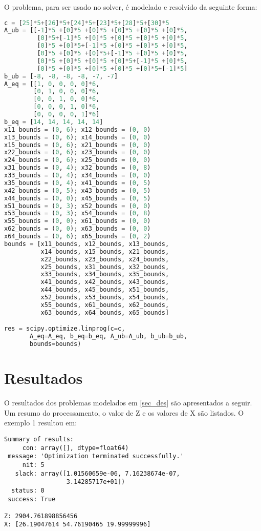 \documentclass[conference,compsoc]{IEEEtran}
\begin{document}
O problema, para ser usado no solver, é modelado e resolvido da seguinte forma:

\begin{lstlisting}[language=Python]
c = [25]*5+[26]*5+[24]*5+[23]*5+[28]*5+[30]*5
A_ub = [[-1]*5 +[0]*5 +[0]*5 +[0]*5 +[0]*5 +[0]*5,
         [0]*5+[-1]*5 +[0]*5 +[0]*5 +[0]*5 +[0]*5,
         [0]*5 +[0]*5+[-1]*5 +[0]*5 +[0]*5 +[0]*5,
         [0]*5 +[0]*5 +[0]*5+[-1]*5 +[0]*5 +[0]*5,
         [0]*5 +[0]*5 +[0]*5 +[0]*5+[-1]*5 +[0]*5,
         [0]*5 +[0]*5 +[0]*5 +[0]*5 +[0]*5+[-1]*5]
b_ub = [-8, -8, -8, -8, -7, -7]
A_eq = [[1, 0, 0, 0, 0]*6,
        [0, 1, 0, 0, 0]*6,
        [0, 0, 1, 0, 0]*6,
        [0, 0, 0, 1, 0]*6,
        [0, 0, 0, 0, 1]*6]
b_eq = [14, 14, 14, 14, 14]
x11_bounds = (0, 6); x12_bounds = (0, 0)
x13_bounds = (0, 6); x14_bounds = (0, 0)
x15_bounds = (0, 6); x21_bounds = (0, 0)
x22_bounds = (0, 6); x23_bounds = (0, 0)
x24_bounds = (0, 6); x25_bounds = (0, 0)
x31_bounds = (0, 4); x32_bounds = (0, 8)
x33_bounds = (0, 4); x34_bounds = (0, 0)
x35_bounds = (0, 4); x41_bounds = (0, 5)
x42_bounds = (0, 5); x43_bounds = (0, 5)
x44_bounds = (0, 0); x45_bounds = (0, 5)
x51_bounds = (0, 3); x52_bounds = (0, 0)
x53_bounds = (0, 3); x54_bounds = (0, 8)
x55_bounds = (0, 0); x61_bounds = (0, 0)
x62_bounds = (0, 0); x63_bounds = (0, 0)
x64_bounds = (0, 6); x65_bounds = (0, 2)
bounds = [x11_bounds, x12_bounds, x13_bounds,
          x14_bounds, x15_bounds, x21_bounds,
          x22_bounds, x23_bounds, x24_bounds,
          x25_bounds, x31_bounds, x32_bounds,
          x33_bounds, x34_bounds, x35_bounds,
          x41_bounds, x42_bounds, x43_bounds,
          x44_bounds, x45_bounds, x51_bounds,
          x52_bounds, x53_bounds, x54_bounds,
          x55_bounds, x61_bounds, x62_bounds,
          x63_bounds, x64_bounds, x65_bounds]

res = scipy.optimize.linprog(c=c,
       A_eq=A_eq, b_eq=b_eq, A_ub=A_ub, b_ub=b_ub,
       bounds=bounds)
\end{lstlisting}

\section{Resultados}\label{sec_result}

O resultados dos problemas modelados em \ref{sec_des} são apresentados a seguir. Um resumo do processamento, o valor de Z e os valores de X são listados. O exemplo 1 resultou em:
\begin{lstlisting}
Summary of results:
     con: array([], dtype=float64)
 message: 'Optimization terminated successfully.'
     nit: 5
   slack: array([1.01560659e-06, 7.16238674e-07,
                 3.14285717e+01])
  status: 0
 success: True

Z: 2904.761898856456
X: [26.19047614 54.76190465 19.99999996]
\end{lstlisting}
\end{document}
